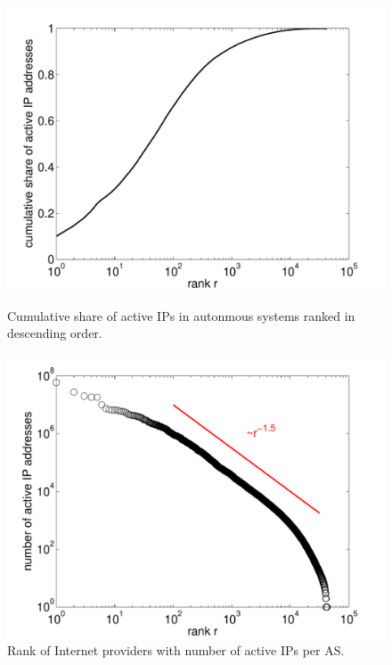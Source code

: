 \begin{figure}[bt]
\begin{minipage}[b]{0.49\textwidth}
  \centering
  \includegraphics[width=1\textwidth]{aslevel/census/figs/shareactiveIPs}
  \caption{Cumulative share of active IPs in autonmous systems ranked in descending order.}
  \label{fig:shareactiveIPs}
\end{minipage}
\hspace{0.01\textwidth}
\begin{minipage}[b]{0.49\textwidth}
  \centering
  \includegraphics[width=\textwidth]{aslevel/census/figs/activeIPs}
  \caption{Rank of Internet providers with number of active IPs per AS.}
  \label{fig:asrank}
\end{minipage}
\end{figure}

